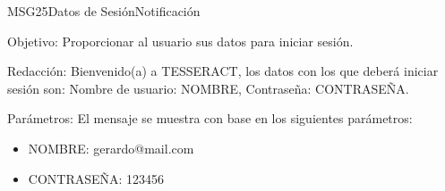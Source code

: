 \begin{mensaje}{MSG25}{Datos de Sesión}{Notificación}
	\item [Objetivo:] Proporcionar al usuario sus datos para iniciar sesión.
	\item[Redacción:] Bienvenido(a) a TESSERACT, los datos con los que deberá iniciar sesión son: Nombre de usuario: NOMBRE, Contraseña: CONTRASEÑA.
	\item[Parámetros:] El mensaje se muestra con base en los siguientes parámetros:
	\begin{itemize}
		\item NOMBRE: gerardo@mail.com
		\item CONTRASEÑA: 123456
	\end{itemize}
\end{mensaje}